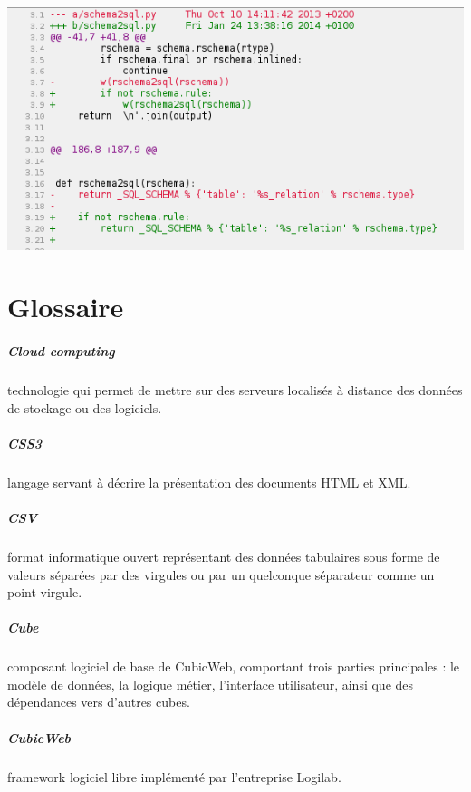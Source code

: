 \documentclass {report}
\begin{document}
\begin{center}
\includegraphics[scale=0.7]{sqltable.png}
\end{center}


\chapter{Glossaire}

\paragraph{Cloud computing}technologie qui permet de mettre sur des serveurs localisés à distance des données de stockage ou des logiciels.
\paragraph{CSS3}langage servant à décrire la présentation des documents HTML et XML.
\paragraph{CSV}format informatique ouvert représentant des données tabulaires sous forme de valeurs séparées par des virgules ou par un quelconque séparateur comme un point-virgule.
\paragraph{Cube}composant logiciel de base de CubicWeb, comportant trois parties principales : le modèle de données, la logique métier, l’interface utilisateur, ainsi que des dépendances vers d’autres cubes. 
\paragraph{CubicWeb}framework logiciel libre implémenté par l'entreprise Logilab.
\end{document}
